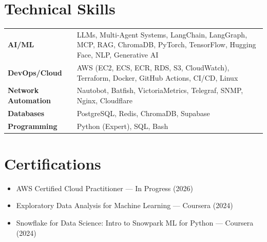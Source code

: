 \documentclass[letterpaper,11pt]{article}
\newcommand{\resumeitem}[1]{\item #1}
\begin{document}
\section{Technical Skills}

\noindent
\begin{tabular}{@{}p{3.8cm}p{10.7cm}}
  \textbf{AI/ML}               & LLMs, Multi-Agent Systems, LangChain, LangGraph, MCP, RAG,
                                 ChromaDB, PyTorch, TensorFlow, Hugging Face, NLP, Generative AI \\[4pt]
  \textbf{DevOps/Cloud}        & AWS (EC2, ECS, ECR, RDS, S3, CloudWatch), Terraform, Docker,
                                 GitHub Actions, CI/CD, Linux \\[4pt]
  \textbf{Network Automation}  & Nautobot, Batfish, VictoriaMetrics, Telegraf, SNMP, Nginx, Cloudflare \\[4pt]
  \textbf{Databases}           & PostgreSQL, Redis, ChromaDB, Supabase \\[4pt]
  \textbf{Programming}         & Python (Expert), SQL, Bash \\
\end{tabular}

\section{Certifications}

\begin{itemize}
  \resumeitem{AWS Certified Cloud Practitioner --- In Progress (2026)}
  \resumeitem{Exploratory Data Analysis for Machine Learning --- Coursera (2024)}
  \resumeitem{Snowflake for Data Science: Intro to Snowpark ML for Python --- Coursera (2024)}
\end{itemize}
\end{document}
